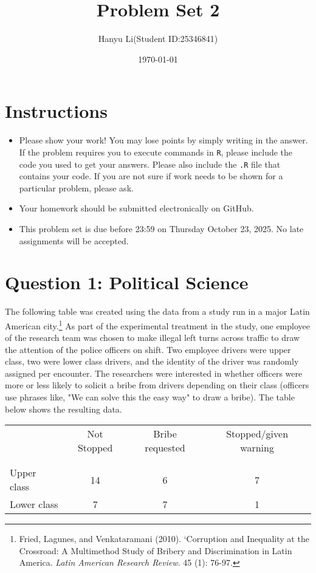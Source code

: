 \documentclass[12pt,letterpaper]{article}
\title{Problem Set 2}
\date{\today}
\author{Hanyu Li(Student ID:25346841)}
\begin{document}
	\maketitle
	
	\section*{Instructions}
	\begin{itemize}
		\item Please show your work! You may lose points by simply writing in the answer. If the problem requires you to execute commands in \texttt{R}, please include the code you used to get your answers. Please also include the \texttt{.R} file that contains your code. If you are not sure if work needs to be shown for a particular problem, please ask.
		\item Your homework should be submitted electronically on GitHub.
		\item This problem set is due before 23:59 on Thursday October 23, 2025. No late assignments will be accepted.
	\end{itemize}
	
	\section*{Question 1: Political Science}
	The following table was created using the data from a study run in a major Latin American city.\footnote{Fried, Lagunes, and Venkataramani (2010). `Corruption and Inequality at the Crossroad: A Multimethod Study of Bribery and Discrimination in Latin America. \textit{Latin American Research Review}. 45 (1): 76-97.} 
	As part of the experimental treatment in the study, one employee of the research team was chosen to make illegal left turns across traffic to draw the attention of the police officers on shift. Two employee drivers were upper class, two were lower class drivers, and the identity of the driver was randomly assigned per encounter. The researchers were interested in whether officers were more or less likely to solicit a bribe from drivers depending on their class (officers use phrases like, "We can solve this the easy way" to draw a bribe). The table below shows the resulting data.
	
	\begin{table}[h!]
		\centering
		\begin{tabular}{l | c c c }
			& Not Stopped & Bribe requested & Stopped/given warning \\ \\[-1.8ex] \hline \\[-1.8ex]
			Upper class & 14 & 6 & 7 \\
			Lower class & 7 & 7 & 1 \\
			\hline
		\end{tabular}
	\end{table}
	
\end{document}

